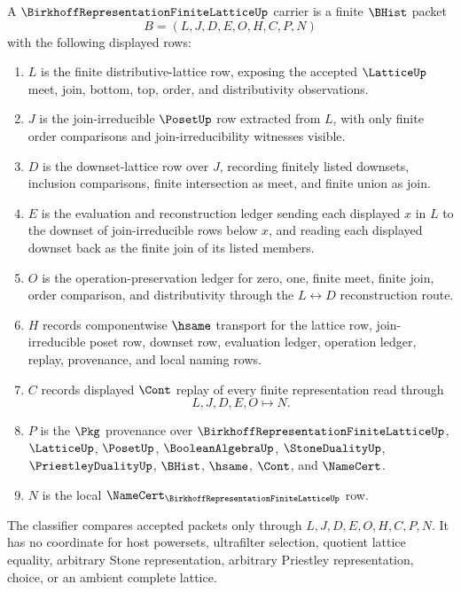 \begin{definition}
\label{def:birkhoff-representation-finite-lattice-carrier}
A $\BirkhoffRepresentationFiniteLatticeUp$ carrier is a finite $\BHist$ packet
$$
B=(L,J,D,E,O,H,C,P,N)
$$
with the following displayed rows:
\begin{enumerate}
\item $L$ is the finite distributive-lattice row, exposing the accepted $\LatticeUp$ meet, join, bottom, top, order, and distributivity observations.
\item $J$ is the join-irreducible $\PosetUp$ row extracted from $L$, with only finite order comparisons and join-irreducibility witnesses visible.
\item $D$ is the downset-lattice row over $J$, recording finitely listed downsets, inclusion comparisons, finite intersection as meet, and finite union as join.
\item $E$ is the evaluation and reconstruction ledger sending each displayed $x$ in $L$ to the downset of join-irreducible rows below $x$, and reading each displayed downset back as the finite join of its listed members.
\item $O$ is the operation-preservation ledger for zero, one, finite meet, finite join, order comparison, and distributivity through the $L \leftrightarrow D$ reconstruction route.
\item $H$ records componentwise $\hsame$ transport for the lattice row, join-irreducible poset row, downset row, evaluation ledger, operation ledger, replay, provenance, and local naming rows.
\item $C$ records displayed $\Cont$ replay of every finite representation read through
$$
L,J,D,E,O \longmapsto N .
$$
\item $P$ is the $\Pkg$ provenance over $\BirkhoffRepresentationFiniteLatticeUp$, $\LatticeUp$, $\PosetUp$, $\BooleanAlgebraUp$, $\StoneDualityUp$, $\PriestleyDualityUp$, $\BHist$, $\hsame$, $\Cont$, and $\NameCert$.
\item $N$ is the local $\NameCert_{\BirkhoffRepresentationFiniteLatticeUp}$ row.
\end{enumerate}
The classifier compares accepted packets only through $L,J,D,E,O,H,C,P,N$. It has no coordinate for host powersets, ultrafilter selection, quotient lattice equality, arbitrary Stone representation, arbitrary Priestley representation, choice, or an ambient complete lattice.
\end{definition}

